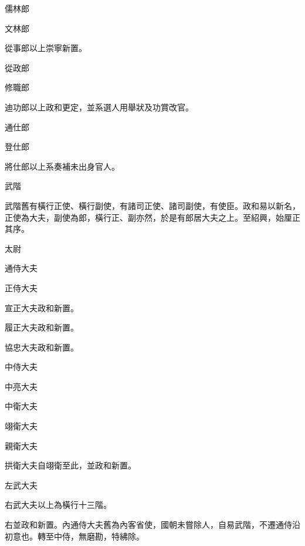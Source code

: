 \begin{pinyinscope}
 儒林郎



 文林郎



 從事郎以上崇寧新置。



 從政郎



 修職郎



 迪功郎以上政和更定，並系選人用舉狀及功賞改官。



 通仕郎



 登仕郎



 將仕郎以上系奏補未出身官人。



 武階



 武階舊有橫行正使、橫行副使，有諸司正使、諸司副使，有使臣。政和易以新名，正使為大夫，副使為郎，橫行正、副亦然，於是有郎居大夫之上。至紹興，始厘正其序。



 太尉



 通侍大夫



 正侍大夫



 宣正大夫政和新置。



 履正大夫政和新置。



 協忠大夫政和新置。



 中侍大夫



 中亮大夫



 中衛大夫



 翊衛大夫



 親衛大夫



 拱衛大夫自翊衛至此，並政和新置。



 左武大夫



 右武大夫以上為橫行十三階。



 右並政和新置。內通侍大夫舊為內客省使，國朝未嘗除人，自易武階，不遷通侍沿初意也。轉至中侍，無磨勘，特紼除。




\end{pinyinscope}
